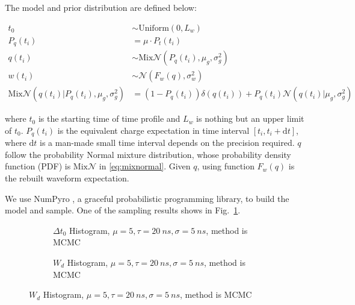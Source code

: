 The model and prior distribution are defined below: 

\begin{align}
    t_{0} &\sim \mathrm{Uniform}(0, L_{w}) \\
    P_{q}(t_{i}) &= \mu \cdot P_{t}(t_{i}) \\
    q(t_{i}) &\sim \mathrm{Mix}\mathcal{N}(P_{q}(t_{i}), \mu_{g}, \sigma_{g}^{2}) \\
    w(t_{i}) &\sim \mathcal{N}(F_{w}(q), \sigma_{w}^{2}) \\
    \mathrm{Mix}\mathcal{N}(q(t_{i}) | P_{q}(t_{i}), \mu_{g}, \sigma_{g}^{2}) &= (1 - P_{q}(t_{i}))\delta(q(t_{i})) + P_{q}(t_{i})\mathcal{N}(q(t_{i}) | \mu_{g}, \sigma_{g}^{2}) \label{eq:mixnormal}
\end{align}

where $t_{0}$ is the starting time of time profile and $L_{w}$ is nothing but an upper limit of $t_{0}$. $P_{q}(t_{i})$ is the equivalent charge expectation in time interval $[t_{i}, t_{i}+\mathrm{d}t]$, where $\mathrm{d}t$ is a man-made small time interval depends on the precision required. $q$ follow the probability Normal mixture distribution, whose probability density function (PDF) is $\mathrm{Mix}\mathcal{N}$ in \eqref{eq:mixnormal}. Given $q$, using function $F_{w}(q)$ is the rebuilt waveform expectation. 

We use NumPyro \cite{phan2019composable}, a graceful probabilistic programming library, to build the model and sample. One of the sampling results shows in Fig.~\ref{fig:mcmcrec-t0hist}. 

\begin{figure}[H]
\begin{minipage}[t]{.5\textwidth}
\begin{figure}[H]
    \centering
    \resizebox{\textwidth}{!}{}
    \caption{\label{fig:mcmcrec-t0hist} $\Delta t_{0}$ Histogram, $\mu=5, \tau=\SI{20}{ns}, \sigma=\SI{5}{ns}$, method is MCMC}
\end{figure}
\end{minipage}
\begin{minipage}[t]{.5\textwidth}
\begin{figure}[H]
    \centering
    \resizebox{\textwidth}{!}{}
    \caption{\label{fig:mcmcrec-chargehist} $W_{d}$ Histogram, $\mu=5, \tau=\SI{20}{ns}, \sigma=\SI{5}{ns}$, method is MCMC}
\end{figure}
\end{minipage}
\end{figure}


